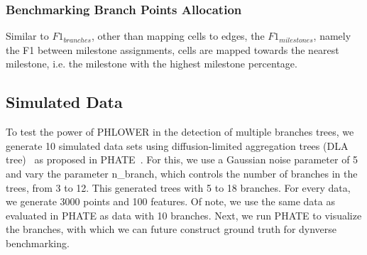\subsubsection{Benchmarking Branch Points Allocation}
Similar to $F1_{branches}$, other than mapping cells to edges, the $F1_{milestones}$, namely the F1 between milestone assignments, cells are mapped towards the nearest milestone, i.e. the milestone with the highest milestone percentage.




\subsection{Simulated Data}
To test the power of PHLOWER in the detection of multiple branches trees, we generate 10 simulated data sets using diffusion-limited aggregation trees (DLA tree)~\citep{witten1981diffusion} as proposed in PHATE~\citep{moon2017phate}. For this, we use a Gaussian noise parameter of 5 and vary the parameter n\_branch, which controls the number of branches in the trees, from 3 to 12. This generated trees with 5 to 18 branches.  For every data, we generate 3000 points and 100 features. Of note, we use the same data as evaluated in PHATE as data with 10 branches. Next, we run PHATE to visualize the branches, with which we can future construct ground truth for dynverse benchmarking.


